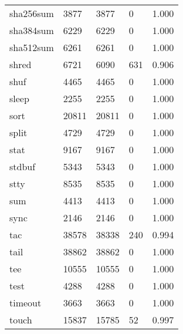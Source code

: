 \begin{longtable}{lp{4.5cm}p{4.5cm}p{4.5cm}p{4.5cm}}
sha256sum &                     3877 &         3877 &             0 &                    1.000 \\
sha384sum &                     6229 &         6229 &             0 &                    1.000 \\
sha512sum &                     6261 &         6261 &             0 &                    1.000 \\
shred     &                     6721 &         6090 &           631 &                    0.906 \\
shuf      &                     4465 &         4465 &             0 &                    1.000 \\
sleep     &                     2255 &         2255 &             0 &                    1.000 \\
sort      &                    20811 &        20811 &             0 &                    1.000 \\
split     &                     4729 &         4729 &             0 &                    1.000 \\
stat      &                     9167 &         9167 &             0 &                    1.000 \\
stdbuf    &                     5343 &         5343 &             0 &                    1.000 \\
stty      &                     8535 &         8535 &             0 &                    1.000 \\
sum       &                     4413 &         4413 &             0 &                    1.000 \\
sync      &                     2146 &         2146 &             0 &                    1.000 \\
tac       &                    38578 &        38338 &           240 &                    0.994 \\
tail      &                    38862 &        38862 &             0 &                    1.000 \\
tee       &                    10555 &        10555 &             0 &                    1.000 \\
test      &                     4288 &         4288 &             0 &                    1.000 \\
timeout   &                     3663 &         3663 &             0 &                    1.000 \\
touch     &                    15837 &        15785 &            52 &                    0.997 \\

\end{longtable}

